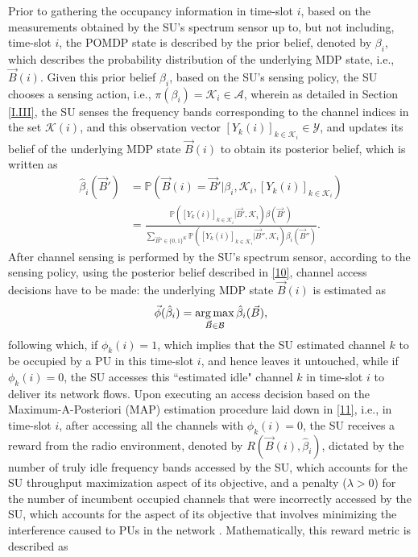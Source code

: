 Prior to gathering the occupancy information in time-slot $i$, based on the measurements obtained by the SU's spectrum sensor up to, but not including, time-slot $i$, the POMDP state is described by the prior belief, denoted by $\beta_{i}$, which describes the probability distribution of the underlying MDP state, i.e., $\vec{B}(i)$. Given this prior belief $\beta_{i}$, based on the SU's sensing policy, the SU chooses a sensing action, i.e., $\pi(\beta_{i})=\mathcal{K}_{i}{\in}\mathcal{A}$, wherein as detailed in Section \ref{I.III}, the SU senses the frequency bands corresponding to the channel indices in the set $\mathcal{K}(i)$, and this observation vector $[Y_{k}(i)]_{k{\in}\mathcal{K}_{i}}{\in}\mathcal{Y}$, and updates its belief of the underlying MDP state $\vec{B}(i)$ to obtain its posterior belief, which is written as
\begin{equation}\label{10}
    \begin{aligned}
        \hat{\beta}_{i}(\vec{B}')&=\mathbb{P}(\vec{B}(i)=\vec{B}'|\beta_{i},\mathcal{K}_{i},[Y_{k}(i)]_{k{\in}\mathcal{K}_{i}})\\
        &=\frac{\mathbb{P}([Y_{k}(i)]_{k{\in}\mathcal{K}_{i}}|\vec{B}',\mathcal{K}_{i})\beta(\vec{B}')}{\sum_{\vec{B}'' \in \{0,1\}^{K}}\mathbb{P}([Y_{k}(i)]_{k{\in}\mathcal{K}_{i}}|\vec{B}'',\mathcal{K}_{i})\beta_{i}(\vec{B}'')}.
    \end{aligned}
\end{equation}
After channel sensing is performed by the SU's spectrum sensor, according to the sensing policy, using the posterior belief described in \eqref{10}, channel access decisions have to be made: the underlying MDP state $\vec{B}(i)$ is estimated as
\begin{equation}\label{11}
    \vec{\phi}(\hat{\beta}_{i})=\operatorname*{arg\,max}_{\vec{B} \in \mathcal{B}}\hat{\beta}_{i}(\vec{B}),
\end{equation}
following which, if $\phi_{k}(i){=}1$, which implies that the SU estimated channel $k$ to be occupied by a PU in this time-slot $i$, and hence leaves it untouched, while if $\phi_{k}(i){=}0$, the SU accesses this ``estimated idle" channel $k$ in time-slot $i$ to deliver its network flows. Upon executing an access decision based on the Maximum-A-Posteriori (MAP) estimation procedure laid down in \eqref{11}, i.e., in time-slot $i$, after accessing all the channels with $\phi_{k}(i){=}0$, the SU receives a reward from the radio environment, denoted by $R(\vec{B}(i),\hat{\beta}_{i})$, dictated by the number of truly idle frequency bands accessed by the SU, which accounts for the SU throughput maximization aspect of its objective, and a penalty ($\lambda{>}0$) for the number of incumbent occupied channels that were incorrectly accessed by the SU, which accounts for the aspect of its objective that involves minimizing the interference caused to PUs in the network \cite{WCL:paper}. Mathematically, this reward metric is described as
